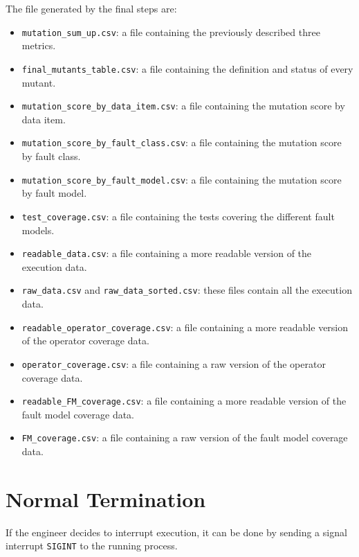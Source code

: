 The file generated by the final steps are:

\begin{itemize}
	\item \texttt{mutation\_sum\_up.csv}: a file containing the previously described three metrics.
	\item \texttt{final\_mutants\_table.csv}: a file containing the definition and status of every mutant.
	\item \texttt{mutation\_score\_by\_data\_item.csv}: a file containing the mutation score by data item.
	\item \texttt{mutation\_score\_by\_fault\_class.csv}: a file containing the mutation score by fault class.
	\item \texttt{mutation\_score\_by\_fault\_model.csv}: a file containing the mutation score by fault model.
	\item \texttt{test\_coverage.csv}: a file containing the tests covering the different fault models.
	\item \texttt{readable\_data.csv}: a file containing a more readable version of the execution data.
	\item \texttt{raw\_data.csv} and \texttt{raw\_data\_sorted.csv}: these files contain all the execution data.
	\item \texttt{readable\_operator\_coverage.csv}: a file containing a more readable version of the operator coverage data.
	\item \texttt{operator\_coverage.csv}: a file containing a raw version of the operator coverage data.
	\item \texttt{readable\_FM\_coverage.csv}: a file containing a more readable version of the fault model coverage data.
	\item \texttt{FM\_coverage.csv}: a file containing a raw version of the fault model coverage data.
\end{itemize}

\section{Normal Termination}


If the engineer decides to interrupt \DAMA execution, it can be done by sending a signal interrupt \texttt{SIGINT} to the running process.

